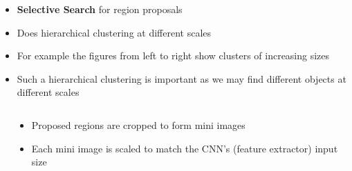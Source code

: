 \begin{frame}
\begin{columns}
\begin{overlayarea}{\textwidth}{\textheight}
			\begin{itemize}
				\justifying
				\item<2-> \textbf{Selective Search} for region proposals 
				\item<3-> Does hierarchical clustering at different scales 
				\item<4-> For example the figures from left to right show clusters of increasing sizes
				\item<5-> Such a hierarchical clustering is important as we may find different objects at different scales 
			\end{itemize}
		\end{overlayarea}
	\end{columns}
\end{frame}


\begin{frame}
	\begin{center}
		
	\end{center}

	\vspace{-0.5cm}
	\begin{columns}
		\begin{overlayarea}{\textwidth}{\textheight}
			\begin{center}
				
			\end{center}
			
		\end{overlayarea}
		
		\begin{overlayarea}{\textwidth}{\textheight}
			\vspace{0.5cm}
			\begin{itemize}
				\justifying
				\item<2-> Proposed regions are cropped to form mini images
				\item<3-> Each mini image is scaled to match the CNN's (feature extractor) input size 
			\end{itemize}  
		\end{overlayarea}     
	\end{columns}
\end{frame}


